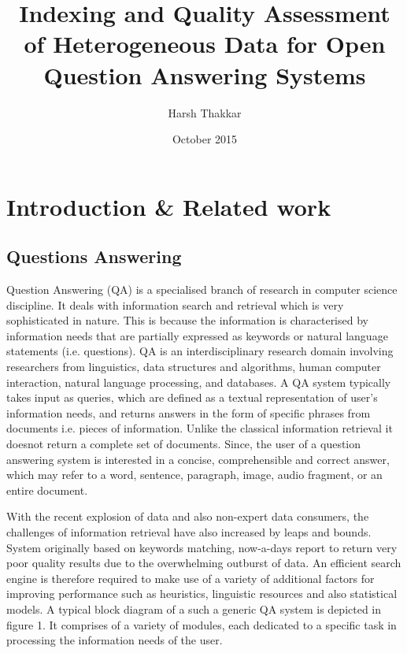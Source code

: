 \documentclass{article}
\title{Indexing and Quality Assessment of Heterogeneous Data for Open Question Answering Systems}
\author{Harsh Thakkar}
\date{October 2015}
\begin{document}
\maketitle

\section{Introduction \& Related work}
\label{intro}
\subsection{Questions Answering}
\label{qaintro}

Question Answering (QA) is a specialised branch of research in computer science discipline. It deals with information search and retrieval which is very sophisticated in nature. This is because the information is characterised by information needs that are  partially expressed as keywords or natural language statements (i.e. questions). QA is an interdisciplinary research domain involving researchers from linguistics, data structures and algorithms, human computer interaction, natural language processing, and databases. A QA system typically takes input as queries, which are defined as a textual representation of user's information needs, and returns answers in the form of specific phrases from documents i.e. pieces of information. Unlike the classical information retrieval it doesnot return a complete set of documents. Since, the user of a question answering system is interested in a concise, comprehensible and correct answer, which may refer to a word, sentence, paragraph, image, audio fragment, or an entire document.

With the recent explosion of data and also non-expert data consumers, the challenges of information retrieval have also increased by leaps and bounds. System originally based on keywords matching, now-a-days report to return very poor quality results due to the overwhelming outburst of data. An efficient search engine is therefore required to make use of a variety of additional factors for improving performance such as heuristics, linguistic resources and also statistical models. A typical block diagram of a such a generic QA system is depicted in figure 1. It comprises of a variety of modules, each dedicated to a specific task in processing the information needs of the user. 
\end{document}
